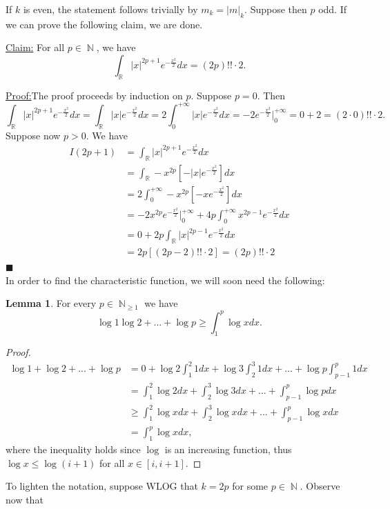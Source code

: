 \documentclass[12pt,a4paper]{report}
\theoremstyle{definition}
\newtheorem{lemma}[teo]{Lemma}  %
\theoremstyle{num.custom-title}
\newenvironment{claim}[1]{\par\noindent\underline{Claim:}\space#1}{} %
\newenvironment{claimproof}[1]{\par\noindent\underline{Proof:}\space#1}{\leavevmode\unskip\penalty9999 \hbox{}\nobreak\hfill\quad\hbox{$\blacksquare$}} %
\DeclareMathOperator{\N}{\mathbb{N}}
\newcommand{\R}{\mathbb{R}}
\renewcommand{\1}{\mathbbm{1}}
\begin{document}
If $k$ is even, the statement follows trivially by $m_k=|m|_k$. Suppose then $p$ odd. If we can prove the following claim, we are done.
\begin{claim}{}
For all $p \in \N$, we have
\[
\int_\R |x|^{2p+1} e^{-\frac{x^2}{2}} dx = (2p)!! \cdot 2.
\]
\begin{claimproof} The proof proceeds by induction on $p$.
Suppose $p=0$. Then 
\[
\int_\R |x|^{2p+1} e^{-\frac{x^2}{2}} dx = \int_\R |x| e^{-\frac{x^2}{2}} dx = 2 \int_0^{+\infty} |x| e^{-\frac{x^2}{2}} dx = -2 e^{-\frac{x^2}{2}} \Bigg|_0^{+\infty} = 0+2 = (2\cdot 0)!! \cdot 2.
\]
Suppose now $p>0$. We have
\begin{align*}
I(2p+1) 
&= \int_\R |x|^{2p+1} e^{-\frac{x^2}{2}} dx\\
&= \int_\R -x^{2p} \left[ -|x| e^{-\frac{x^2}{2}} \right] dx\\
&= 2 \int_0^{+\infty} -x^{2p} \left[ -x e^{-\frac{x^2}{2}} \right] dx\\
&= -2x^{2p} e^{-\frac{x^2}{2}} \Bigg|_0^{+\infty} + 4p \int_0^{+\infty} x^{2p-1} e^{-\frac{x^2}{2}} dx\\
&= 0+ 2p \int_\R |x|^{2p-1} e^{-\frac{x^2}{2}} dx\\
&= 2p [(2p-2)!!\cdot 2] = (2p)!!\cdot 2
\end{align*}
\end{claimproof}
\end{claim}\ \\
In order to find the characteristic function, we will soon need the following:
\begin{lemma}
For every $p \in \N_{\geq 1}$ we have
\[
\log 1 \log 2 + ... + \log p \geq \int_1^p \log x dx.
\]
\begin{proof}
\begin{align*}
\log 1 + \log 2 + ... + \log p 
&= 0 + \log 2 \int_1^2 1 dx + \log 3 \int_2^3 1 dx + ... + \log p \int_{p-1}^p 1 dx\\
&= \int_1^2 \log 2 dx + \int_2^3 \log 3 dx + ... + \int_{p-1}^p \log p dx\\
&\geq \int_1^2 \log x dx + \int_2^3 \log x dx + ... + \int_{p-1}^p \log x dx\\
&= \int_1^p \log x dx,
\end{align*}
where the inequality holds since $\log$ is an increasing function, thus $\log x \leq \log (i+1)$ for all $x \in [i,i+1]$.
\end{proof}
\end{lemma}
To lighten the notation, suppose WLOG that $k=2p$ for some $p \in \N$. Observe now that
\end{document}
